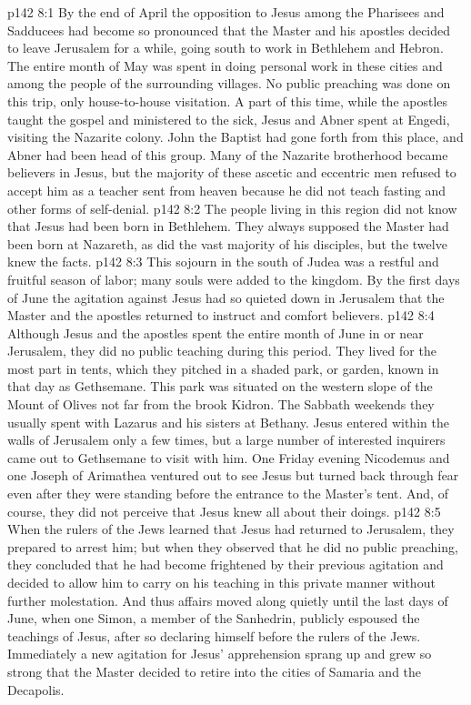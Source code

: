 \vs p142 8:1 By the end of April the opposition to Jesus among the Pharisees and Sadducees had become so pronounced that the Master and his apostles decided to leave Jerusalem for a while, going south to work in Bethlehem and Hebron. The entire month of May was spent in doing personal work in these cities and among the people of the surrounding villages. No public preaching was done on this trip, only house\hyp{}to\hyp{}house visitation. A part of this time, while the apostles taught the gospel and ministered to the sick, Jesus and Abner spent at Engedi, visiting the Nazarite colony. John the Baptist had gone forth from this place, and Abner had been head of this group. Many of the Nazarite brotherhood became believers in Jesus, but the majority of these ascetic and eccentric men refused to accept him as a teacher sent from heaven because he did not teach fasting and other forms of self\hyp{}denial.\plusone
\vs p142 8:2 The people living in this region did not know that Jesus had been born in Bethlehem. They always supposed the Master had been born at Nazareth, as did the vast majority of his disciples, but the twelve knew the facts.
\vs p142 8:3 This sojourn in the south of Judea was a restful and fruitful season of labor; many souls were added to the kingdom. By the first days of June the agitation against Jesus had so quieted down in Jerusalem that the Master and the apostles returned to instruct and comfort believers.
\vs p142 8:4 Although Jesus and the apostles spent the entire month of June in or near Jerusalem, they did no public teaching during this period. They lived for the most part in tents, which they pitched in a shaded park, or garden, known in that day as Gethsemane. This park was situated on the western slope of the Mount of Olives not far from the brook Kidron. The Sabbath weekends they usually spent with Lazarus and his sisters at Bethany. Jesus entered within the walls of Jerusalem only a few times, but a large number of interested inquirers came out to Gethsemane to visit with him. One Friday evening Nicodemus and one Joseph of Arimathea ventured out to see Jesus but turned back through fear even after they were standing before the entrance to the Master’s tent. And, of course, they did not perceive that Jesus knew all about their doings.
\vs p142 8:5 When the rulers of the Jews learned that Jesus had returned to Jerusalem, they prepared to arrest him; but when they observed that he did no public preaching, they concluded that he had become frightened by their previous agitation and decided to allow him to carry on his teaching in this private manner without further molestation. And thus affairs moved along quietly until the last days of June, when one Simon, a member of the Sanhedrin, publicly espoused the teachings of Jesus, after so declaring himself before the rulers of the Jews. Immediately a new agitation for Jesus’ apprehension sprang up and grew so strong that the Master decided to retire into the cities of Samaria and the Decapolis.
